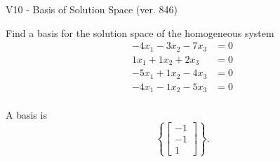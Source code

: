 \begin{exercise}
  \begin{exerciseTitle}V10 - Basis of Solution Space (ver. 846)\end{exerciseTitle}
  \begin{exerciseStatement}
    Find a basis for the solution space of the homogeneous system 
\begin{align*}
 -4 x_ 1 -3 x_ 2 -7 x_ 3 &= 0  \\ 
  1 x_ 1 + 1 x_ 2 + 2 x_ 3 &= 0  \\ 
  -5 x_ 1 + 1 x_ 2 -4 x_ 3 &= 0  \\ 
  -4 x_ 1 -1 x_ 2 -5 x_ 3 &= 0  \\ 
 \end{align*}


 
  \end{exerciseStatement}

  \begin{exerciseAnswer}
   A basis is   
\[\left\{\left[\begin{array}{c}
-1 \\
-1 \\
1
\end{array}\right]\right\}.\]

  


  \end{exerciseAnswer}
\end{exercise}